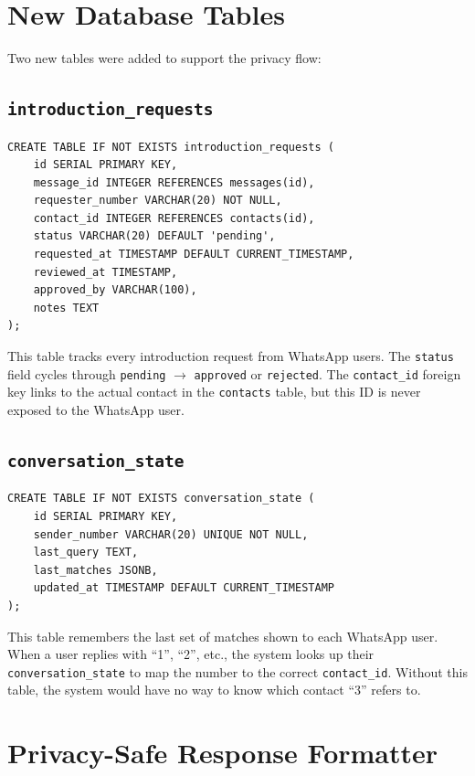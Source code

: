 \documentclass[12pt, a4paper]{report}
\begin{document}
\section{New Database Tables}

Two new tables were added to support the privacy flow:

\subsection{\texttt{introduction\_requests}}

\begin{lstlisting}[style=sqlstyle, caption={Introduction Requests Table}]
CREATE TABLE IF NOT EXISTS introduction_requests (
    id SERIAL PRIMARY KEY,
    message_id INTEGER REFERENCES messages(id),
    requester_number VARCHAR(20) NOT NULL,
    contact_id INTEGER REFERENCES contacts(id),
    status VARCHAR(20) DEFAULT 'pending',
    requested_at TIMESTAMP DEFAULT CURRENT_TIMESTAMP,
    reviewed_at TIMESTAMP,
    approved_by VARCHAR(100),
    notes TEXT
);
\end{lstlisting}

This table tracks every introduction request from WhatsApp users. The \texttt{status} field cycles through \texttt{pending} $\rightarrow$ \texttt{approved} or \texttt{rejected}. The \texttt{contact\_id} foreign key links to the actual contact in the \texttt{contacts} table, but this ID is never exposed to the WhatsApp user.

\subsection{\texttt{conversation\_state}}

\begin{lstlisting}[style=sqlstyle, caption={Conversation State Table}]
CREATE TABLE IF NOT EXISTS conversation_state (
    id SERIAL PRIMARY KEY,
    sender_number VARCHAR(20) UNIQUE NOT NULL,
    last_query TEXT,
    last_matches JSONB,
    updated_at TIMESTAMP DEFAULT CURRENT_TIMESTAMP
);
\end{lstlisting}

This table remembers the last set of matches shown to each WhatsApp user. When a user replies with ``1'', ``2'', etc., the system looks up their \texttt{conversation\_state} to map the number to the correct \texttt{contact\_id}. Without this table, the system would have no way to know which contact ``3'' refers to.

\section{Privacy-Safe Response Formatter}
\end{document}
